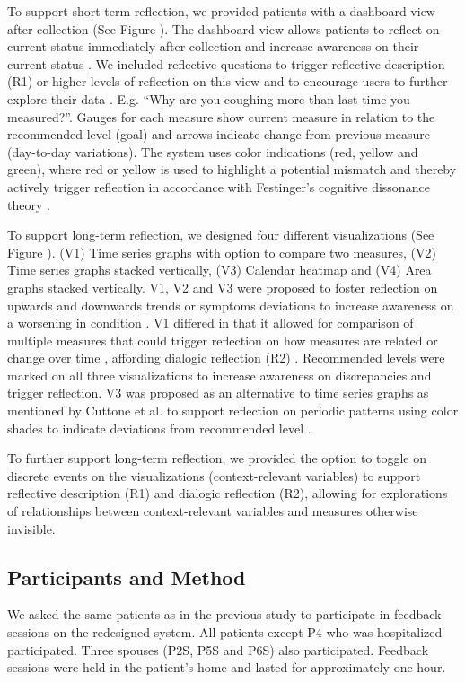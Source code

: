 To support short-term reflection, we provided patients with a dashboard view after collection (See Figure ). The dashboard view allows patients to reflect on current status immediately after collection and increase awareness on their current status \cite{Cutone, Muller}. We included reflective questions to trigger reflective description (R1) or higher levels of reflection on this view and to encourage users to further explore their data \cite{Fleck, Muller}. E.g. “Why are you coughing more than last time you measured?”. Gauges for each measure show current measure in relation to the recommended level (goal) and arrows indicate change from previous measure (day-to-day variations). The system uses color indications (red, yellow and green), where red or yellow is used to highlight a potential mismatch and thereby actively trigger reflection in accordance with Festinger’s cognitive dissonance theory \cite{Rivera}.  

To support long-term reflection, we designed four different visualizations (See Figure ). (V1) Time series graphs with option to compare two measures, (V2) Time series graphs stacked vertically, (V3) Calendar heatmap and (V4) Area graphs stacked vertically. V1, V2 and V3 were proposed to foster reflection on upwards and downwards trends or symptoms deviations to increase awareness on a worsening in condition \cite{Rivera}. V1 differed in that it allowed for comparison of multiple measures that could trigger reflection on how measures are related or change over time \cite{Cuttone}, affording dialogic reflection (R2) \cite{Fleck}. Recommended levels were marked on all three visualizations to increase awareness on discrepancies \cite{Li2010} and trigger reflection. V3 was proposed as an alternative to time series graphs as mentioned by Cuttone et al. to support reflection on periodic patterns using color shades to indicate deviations from recommended level \cite{Cuttone, Li2010}.   

To further support long-term reflection, we provided the option to toggle on discrete events on the visualizations (context-relevant variables) \cite{Sorensen} to support reflective description (R1) and dialogic reflection (R2), allowing for explorations of relationships between context-relevant variables and measures otherwise invisible.  

\subsection{Participants and Method}
We asked the same patients as in the previous study to participate in feedback sessions on the redesigned system. All patients except P4 who was hospitalized participated. Three spouses (P2S, P5S and P6S) also participated. Feedback sessions were held in the patient’s home and lasted for approximately one hour. 

